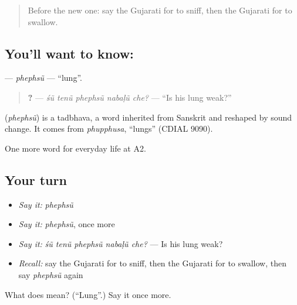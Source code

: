 \label{lesson:GU-C226-phephsu}



\begin{quote}
Before the new one: say the Gujarati for to sniff, then the Gujarati for to swallow.
\end{quote}

\subsection*{You'll want to know: }
\textbf{} — \emph{phephsũ} — \textquotedblleft{}lung\textquotedblright{}.

\begin{quote}
\textbf{    ?} — \emph{śũ tenũ phephsũ nabaḷũ che?} — \textquotedblleft{}Is his lung weak?\textquotedblright{}
\end{quote}

\begin{cousinweb}
\textbf{} (\emph{phephsũ}) is a tadbhava, a word inherited from Sanskrit and reshaped by sound change. It comes from \emph{phupphusa}, \textquotedblleft{}lungs\textquotedblright{} (CDIAL 9090).
\end{cousinweb}

\begin{grammarlens}[title={What you've built}]
One more word for everyday life at A2.
\end{grammarlens}

\subsection*{Your turn}
\begin{itemize}
\raggedright
  \item \emph{Say it:} \emph{phephsũ}
  \item \emph{Say it:} \emph{phephsũ}, once more
  \item \emph{Say it:} \emph{śũ tenũ phephsũ nabaḷũ che?} — Is his lung weak?
  \item \emph{Recall:} say the Gujarati for to sniff, then the Gujarati for to swallow, then say \emph{phephsũ} again
\end{itemize}

\begin{tcolorbox}[breakable,colback=teal!4,colframe=teal!35!black,title={Before you move on}]
What does  mean? (\textquotedblleft{}Lung\textquotedblright{}.) Say it once more.
\end{tcolorbox}
